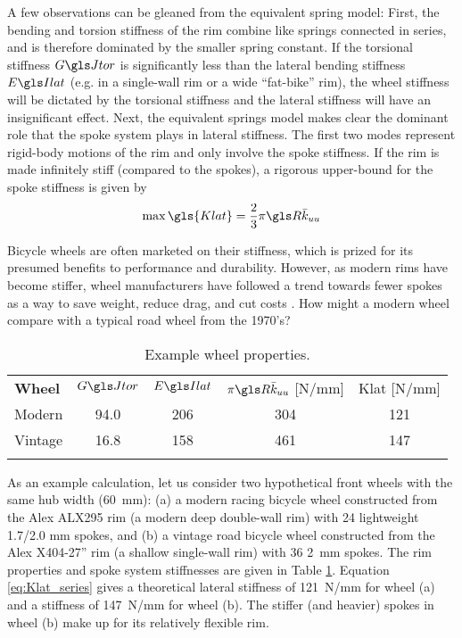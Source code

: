 \documentclass[\rootdir/thesis.tex]{subfiles}
\begin{document}
A few observations can be gleaned from the equivalent spring model: First, the bending and torsion stiffness of the rim combine like springs connected in series, and is therefore dominated by the smaller spring constant. If the torsional stiffness $\GJ$ is significantly less than the lateral bending stiffness $\EIl$ (e.g. in a single-wall rim or a wide ``fat-bike'' rim), the wheel stiffness will be dictated by the torsional stiffness and the lateral stiffness will have an insignificant effect. Next, the equivalent springs model makes clear the dominant role that the spoke system plays in lateral stiffness. The first two modes represent rigid-body motions of the rim and only involve the spoke stiffness. If the rim is made infinitely stiff (compared to the spokes), a rigorous upper-bound for the spoke stiffness is given by
\begin{equation}
\label{eq:Klat_stiff_rim}
\max{\gls{Klat}} = \frac{2}{3} \pi \R \kuu
\end{equation}

Bicycle wheels are often marketed on their stiffness, which is prized for its presumed benefits to performance and durability. However, as modern rims have become stiffer, wheel manufacturers have followed a trend towards fewer spokes as a way to save weight, reduce drag, and cut costs \cite{Brown2011}. How might a modern wheel compare with a typical road wheel from the 1970's?

\begin{table}[h]
\caption{Example wheel properties.\label{tab:wheels}}
\begin{tabular}{@{}lcccc}
\hline\noalign{\smallskip}
\bf{Wheel} & $\GJ$ & $\EIl$ & $\pi\R\kuu$ [N/mm] & \gls{Klat} [N/mm]\\
\noalign{\smallskip}\hline\noalign{\smallskip}
Modern & 94.0 & 206 & 304 & 121\\
Vintage & 16.8 & 158 & 461 & 147\\
\noalign{\smallskip}\hline
\end{tabular}
\end{table}

As an example calculation, let us consider two hypothetical front wheels with the same hub width (\SI{60}{mm}): (a) a modern racing bicycle wheel constructed from the Alex ALX295 rim (a modern deep double-wall rim) with 24 lightweight 1.7/2.0 mm spokes, and (b) a vintage road bicycle wheel constructed from the Alex X404-27'' rim (a shallow single-wall rim) with 36 \SI{2}{mm} spokes. The rim properties and spoke system stiffnesses are given in Table \ref{tab:wheels}. Equation \eqref{eq:Klat_series} gives a theoretical lateral stiffness of \SI{121}{N/mm} for wheel (a) and a stiffness of \SI{147}{N/mm} for wheel (b). The stiffer (and heavier) spokes in wheel (b) make up for its relatively flexible rim.
\end{document}
